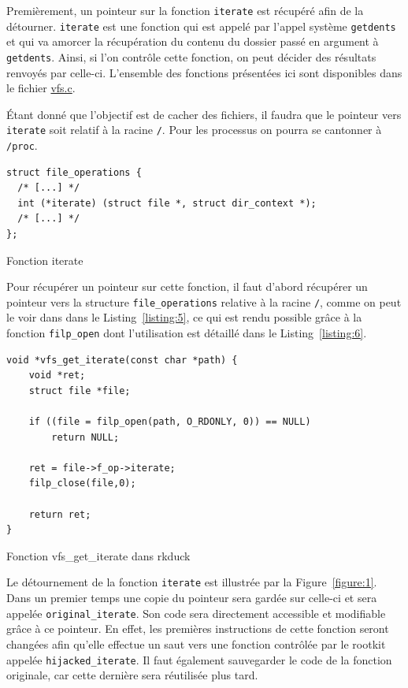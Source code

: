 \documentclass[12pt]{article}
\begin{document}
        Premièrement, un pointeur sur la fonction \texttt{iterate} est récupéré afin de la détourner. \texttt{iterate} est une fonction qui est appelé par l'appel système \texttt{getdents} et qui va amorcer la récupération du contenu du dossier passé en argument à \texttt{getdents}. Ainsi, si l'on contrôle cette fonction, on peut décider des résultats renvoyés par celle-ci. L'ensemble des fonctions présentées ici sont disponibles dans le fichier \href{https://github.com/QuokkaLight/rkduck/blob/master/rkduck/vfs.c}{vfs.c}.

        Étant donné que l'objectif est de cacher des fichiers, il faudra que le pointeur vers \texttt{iterate} soit relatif à la racine \texttt{/}. Pour les processus on pourra se cantonner à \texttt{/proc}. \\

\begin{listing}[H]
\begin{verbatim}
struct file_operations {
  /* [...] */
  int (*iterate) (struct file *, struct dir_context *);
  /* [...] */
};
\end{verbatim}
\caption{Fonction iterate}
\label{listing:5}
\end{listing}

        Pour récupérer un pointeur sur cette fonction, il faut d'abord récupérer un pointeur vers la structure \texttt{file\_operations} relative à la racine \texttt{/}, comme on peut le voir dans dans le Listing~\ref{listing:5}, ce qui est rendu possible grâce à la fonction \texttt{filp\_open} dont l'utilisation est détaillé dans le Listing~\ref{listing:6}.\\

\begin{listing}[H]
\begin{verbatim}
void *vfs_get_iterate(const char *path) {
    void *ret;
    struct file *file;

    if ((file = filp_open(path, O_RDONLY, 0)) == NULL)
        return NULL;

    ret = file->f_op->iterate;
    filp_close(file,0);

    return ret;
}
\end{verbatim}
\caption{Fonction vfs\_get\_iterate dans rkduck}
\label{listing:6}
\end{listing}

        Le détournement de la fonction \texttt{iterate} est illustrée par la Figure~\ref{figure:1}. Dans un premier temps une copie du pointeur sera gardée sur celle-ci et sera appelée \texttt{original\_iterate}. Son code sera directement accessible et modifiable grâce à ce pointeur. En effet, les premières instructions de cette fonction seront changées afin qu'elle effectue un saut vers une fonction contrôlée par le rootkit appelée \texttt{hijacked\_iterate}. Il faut également sauvegarder le code de la fonction originale, car cette dernière sera réutilisée plus tard. \\
\end{document}
